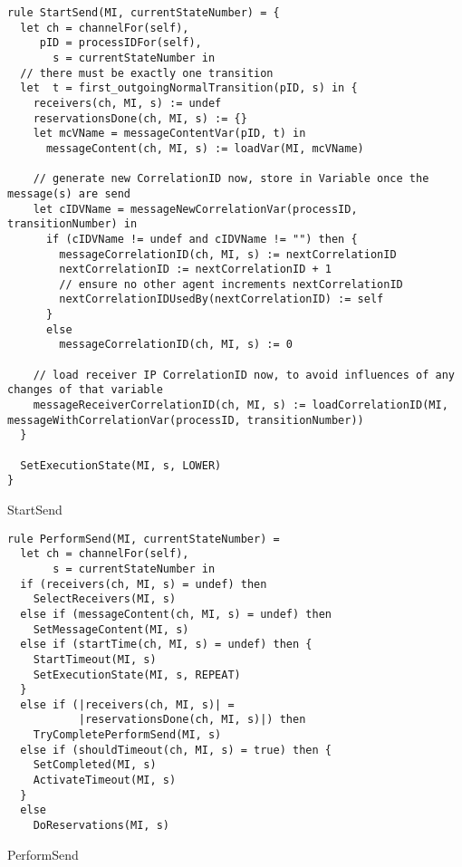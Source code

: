 \begin{listing}[H]
\begin{verbatim}
rule StartSend(MI, currentStateNumber) = {
  let ch = channelFor(self),
     pID = processIDFor(self),
       s = currentStateNumber in
  // there must be exactly one transition
  let  t = first_outgoingNormalTransition(pID, s) in {
    receivers(ch, MI, s) := undef
    reservationsDone(ch, MI, s) := {}
    let mcVName = messageContentVar(pID, t) in
      messageContent(ch, MI, s) := loadVar(MI, mcVName)

    // generate new CorrelationID now, store in Variable once the message(s) are send
    let cIDVName = messageNewCorrelationVar(processID, transitionNumber) in
      if (cIDVName != undef and cIDVName != "") then {
        messageCorrelationID(ch, MI, s) := nextCorrelationID
        nextCorrelationID := nextCorrelationID + 1
        // ensure no other agent increments nextCorrelationID
        nextCorrelationIDUsedBy(nextCorrelationID) := self
      }
      else
        messageCorrelationID(ch, MI, s) := 0

    // load receiver IP CorrelationID now, to avoid influences of any changes of that variable
    messageReceiverCorrelationID(ch, MI, s) := loadCorrelationID(MI, messageWithCorrelationVar(processID, transitionNumber))
  }

  SetExecutionState(MI, s, LOWER)
}
\end{verbatim}
\caption{StartSend}
\label{lst:asm:StartSend}
\end{listing}




\begin{listing}[H]
\begin{verbatim}
rule PerformSend(MI, currentStateNumber) =
  let ch = channelFor(self),
       s = currentStateNumber in
  if (receivers(ch, MI, s) = undef) then
    SelectReceivers(MI, s)
  else if (messageContent(ch, MI, s) = undef) then
    SetMessageContent(MI, s)
  else if (startTime(ch, MI, s) = undef) then {
    StartTimeout(MI, s)
    SetExecutionState(MI, s, REPEAT)
  }
  else if (|receivers(ch, MI, s)| =
           |reservationsDone(ch, MI, s)|) then
    TryCompletePerformSend(MI, s)
  else if (shouldTimeout(ch, MI, s) = true) then {
    SetCompleted(MI, s)
    ActivateTimeout(MI, s)
  }
  else
    DoReservations(MI, s)
\end{verbatim}
\caption{PerformSend}
\label{lst:asm:PerformSend}
\end{listing}




